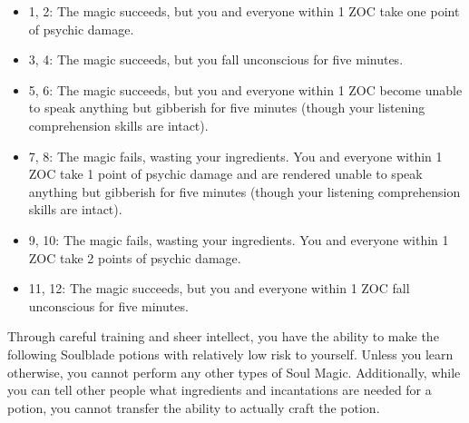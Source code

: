 \documentclass[green]{Kos}
\begin{document}
\begin{itemize}
\item 1, 2: The magic succeeds, but you and everyone within 1 ZOC take one point of psychic damage.
\item 3, 4: The magic succeeds, but you fall unconscious for five minutes.
\item 5, 6: The magic succeeds, but you and everyone within 1 ZOC become unable to speak anything but gibberish for five minutes (though your listening comprehension skills are intact).
\item 7, 8: The magic fails, wasting your ingredients.  You and everyone within 1 ZOC take 1 point of psychic damage and are rendered unable to speak anything but gibberish for five minutes (though your listening comprehension skills are intact).
\item 9, 10: The magic fails, wasting your ingredients. You and everyone within 1 ZOC take 2 points of psychic damage.
\item 11, 12: The magic succeeds, but you and everyone within 1 ZOC fall unconscious for five minutes.
\end{itemize}
Through careful training and sheer intellect, you have the ability to make the following Soulblade potions with relatively low risk to yourself. Unless you learn otherwise, you cannot perform any other types of Soul Magic. Additionally, while you can tell other people what ingredients and incantations are needed for a potion, you cannot transfer the ability to actually craft the potion.
\end{document}
